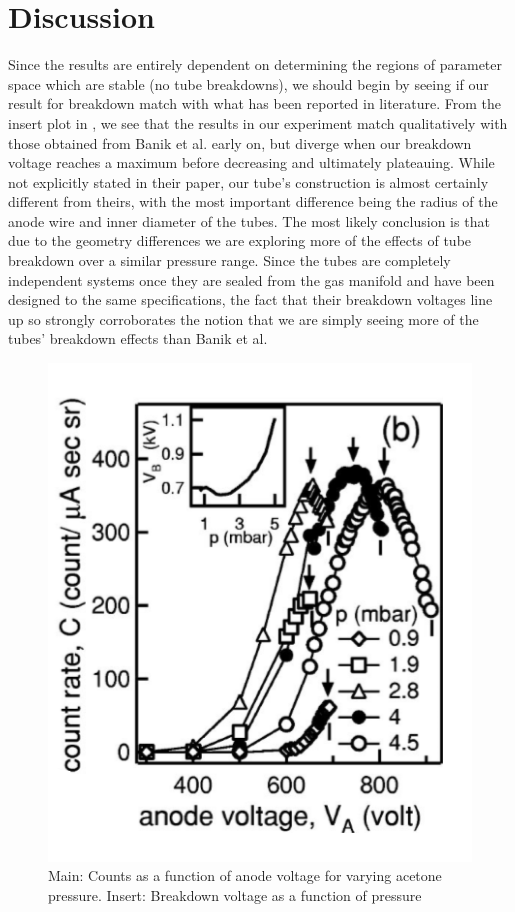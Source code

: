 \section{Discussion}

Since the results are entirely dependent on determining the regions of parameter space which are stable (no tube breakdowns), we should begin by seeing if our result for breakdown 
match with what has been reported in literature. From the insert plot in , we see that the results in our experiment match qualitatively with those obtained from Banik et al. early on, 
but diverge when our breakdown voltage reaches a maximum before decreasing and ultimately plateauing. While not explicitly stated in their paper, our tube's construction is almost certainly 
different from theirs, with the most important difference being the radius of the anode wire and inner diameter of the tubes. The most likely conclusion is that due to the geometry 
differences we are exploring more of the effects of tube breakdown over a similar pressure range. Since the tubes are completely independent systems once they are sealed from the 
gas manifold and have been designed to the same specifications, the fact that their breakdown voltages line up so strongly corroborates the notion that we are simply seeing more of 
the tubes' breakdown effects than Banik et al. 

\begin{figure}[h!]
  \centering
  \includegraphics[scale=0.6]{Figs/litcompare.png}
  \caption{Main: Counts as a function of anode voltage for varying acetone pressure. Insert: Breakdown voltage as a function of pressure}
  \label{fig:litcompare}
\end{figure}

